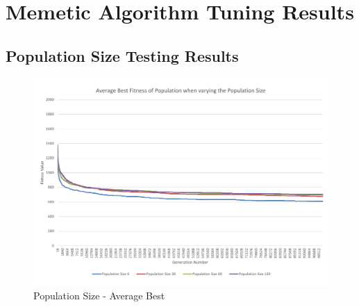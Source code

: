 

\chapter{Memetic Algorithm Tuning Results} %
\label{cha:memetic_algorithm_tunin_results}

\section{Population Size Testing Results} %
\label{sec:population_size_testing_results}

\begin{landscape}
\begin{figure}[thbp]
	\centerline{\includegraphics[height=0.945\textwidth]{figures/CircleTests/PopulationSize/CircleTestsPopulationAverageBest.pdf}}
	\caption{Population Size - Average Best}
	\label{fig:ctpab}
\end{figure}
\end{landscape}

